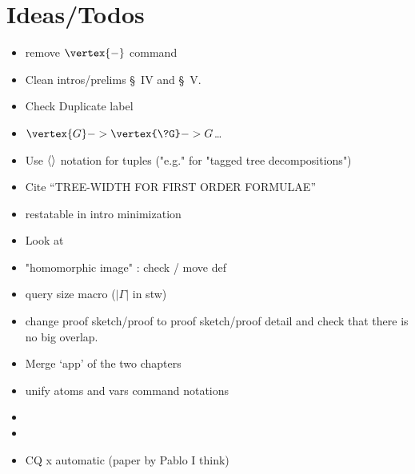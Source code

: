 \chapter*{Ideas/Todos}

\begin{itemize}
	\item remove $\vertex{-}$ command
	\item Clean intros/prelims \S~IV and \S~V.
	\item Check Duplicate label
	\item $\vertex{G} -> \vertex{\?G} -> G$…
	\item Use $\langle\rangle$ notation for tuples ("e.g." for "tagged tree decompositions")
	\item Cite ``TREE-WIDTH FOR FIRST ORDER FORMULAE''
	\item restatable in intro minimization
	\item Look at \cite{ChenGottlobLanzingerPichler2020Semantic}
	\item "homomorphic image" : check / move def
	\item query size macro ($|\Gamma|$ in stw)
	\item change proof sketch/proof to proof sketch/proof detail and check
		that there is no big overlap.
	\item Merge `app' of the two chapters
	\item unify atoms and vars command notations
	\item {}
	\item {}
	\item CQ x automatic (paper by Pablo I think)
\end{itemize}

